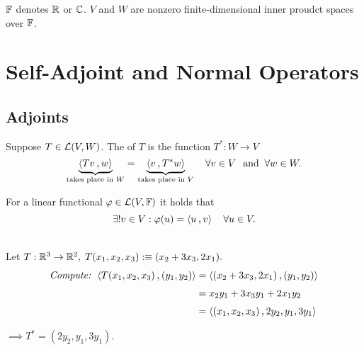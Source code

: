 $\mathbb{F}$ denotes $\mathbb{R}$ or $\mathbb{C}$. $V$ and $W$ are nonzero finite-dimensional inner proudct spaces over $\mathbb{F}$.

\section{Self-Adjoint and Normal Operators}

\subsection{Adjoints}


\begin{mydef}[adjoint, $T^*$]
  Suppose $T\in \mathcal{L}(V,W)$. The  of $T$ is the function $T^{*}: W \to V$ \st
  \[
    \underbrace{\ip{Tv}{w}}_{\text{takes place in $W$}} = \underbrace{\ip{v}{T^{*}w}}_{\text{takes place in $V$}} \quad \forall v \in V \myand \forall w \in W.
  \]
\end{mydef}

 For a linear functional $\varphi \in \mathcal{L} (V, \mathbb{F})$ it holds that
\[
  \exists ! v \in V: \varphi(u) = \ip{u}{v} \quad \forall u \in V.
\]

\begin{example}
  \phantom{.} \\
  Let $T: \mathbb{R}^3 \to \mathbb{R}^2, \; T(x_1,x_2,x_3):\equiv (x_2+3x_3,2x_1).$
  \begin{equation}
    \begin{aligned}
      \text{\emph{Compute: }} \ip{T(x_1,x_2,x_3)}{(y_1, y_2)}
      & = \ip{(x_2+3x_3,2x_1)}{(y_1,y_2)} \\
      & = x_2 y_1 + 3 x_3 y_1 + 2 x_1 y_2 \\
      & = \ip{(x_1, x_2, x_3)}{2 y_2,y_1,3y_1} \\
    \end{aligned}
  \end{equation}

  $\implies T^{*} = (2y_2, y_1, 3y_1).$
\end{example}

